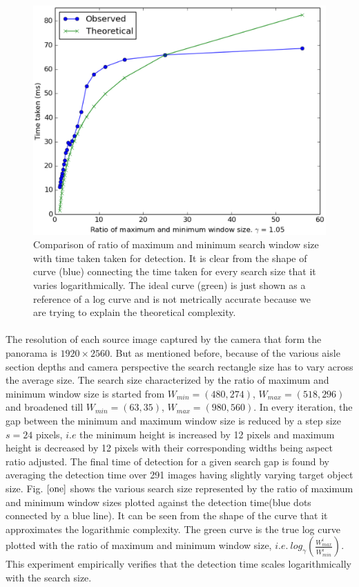 \begin{figure}[h]
    \centering
    \includegraphics[width=\textwidth]{Appendices/figures1/winSize_vs_time}
    \caption{Comparison of ratio of maximum and minimum search window size with time taken taken for detection. It is clear from the shape of curve (blue) connecting the time taken for every search size that it varies logarithmically. The ideal curve (green) is just shown as a reference of a log curve and is not metrically accurate because we are trying to explain the theoretical complexity.}
    \label{one}
\end{figure}

\paragraph{}
The resolution of each source image captured by the camera that form the panorama is $1920 \times 2560$. But as mentioned before, because of the various aisle section depths and camera perspective the search rectangle size has to vary across the average size. The search size characterized by the ratio of maximum and minimum window size is started from $W_{min}=(480, 274)$, $W_{max}=(518, 296)$ and broadened till $W_{min}=(63, 35)$, $W_{max}=(980, 560)$. In every iteration, the gap between the minimum and maximum window size is reduced by a step size $s = 24$ pixels, $i.e$ the minimum height is increased by 12 pixels and maximum height is decreased by 12 pixels with their corresponding widths being aspect ratio adjusted. The final time of detection for a given search gap is found by averaging the detection time over 291 images having slightly varying target object size. Fig. $\ref{one}$ shows the various search size represented by the ratio of maximum and minimum window sizes plotted against the detection time(blue dots connected by a blue line). It can be seen from the shape of the curve that it approximates the logarithmic complexity. The green curve is the true log curve plotted with the ratio of maximum and minimum window size, $i.e. \ log_\gamma(\frac{W_{max}^i}{W_{min}^i})$. This experiment empirically verifies that the detection time scales logarithmically with the search size.

